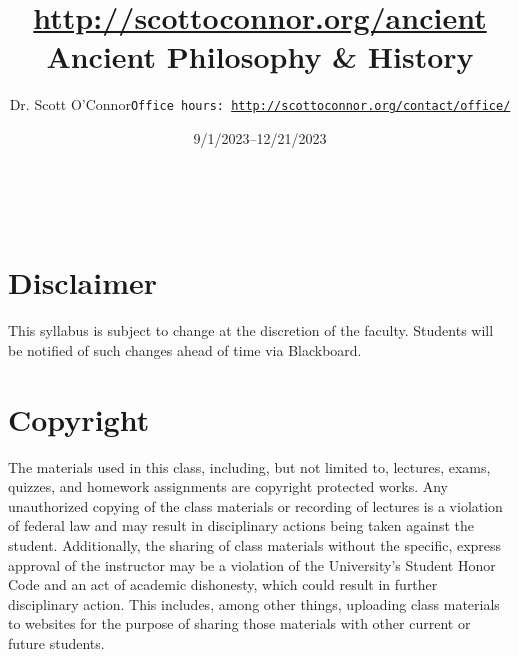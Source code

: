 \documentclass[article,oneside]{memoir}
\def\myauthor{Author}
\def\mytitle{Title}
\def\mycopyright{\myauthor}
\def\myweb{\href{http://scottoconnor.org/ancient}{http://scottoconnor.org/ancient}}
\def\myauthor{Dr. Scott O'Connor}
\def\mytitle{{\normalsize \myweb \newline} \HUGE Ancient Philosophy \& History}
\begin{document}
\setsansfont[Mapping=tex-text]{Myriad Pro} 
\setmonofont[Mapping=tex-text,Scale=0.8]{Georgia} 

\def\ind{\hangindent=1 true cm\hangafter=1 \noindent}
\def\labelitemi{$\cdot$}


\title{\LARGE \mytitle}     
\author{\Large\myauthor \newline \footnotesize\texttt{\noindent Office hours: \href{http://scottoconnor.org/contact/office/}{http://scottoconnor.org/contact/office/}}}
\date{9/1/2023--12/21/2023}
\\


\maketitle




%
%



\section{Disclaimer}
 This syllabus is subject to change at the discretion of the faculty. Students will be notified of such changes ahead of time via Blackboard. 


\section{Copyright}
The materials used in this class, including, but not limited to, lectures, exams, quizzes, and homework assignments are copyright protected works.  Any unauthorized copying of the class materials or recording of lectures is a violation of federal law and may result in disciplinary actions being taken against the student.  Additionally, the sharing of class materials without the specific, express approval of the instructor may be a violation of the University's Student Honor Code and an act of academic dishonesty, which could result in further disciplinary action.  This includes, among other things, uploading class materials to websites for the purpose of sharing those materials with other current or future students. 
\end{document}
